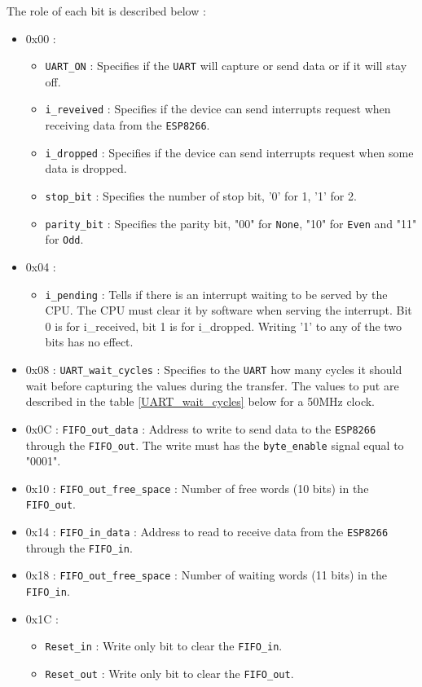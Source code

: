 \documentclass[11pt]{article}
\begin{document}
The role of each bit is described below :
\begin{itemize}
    \item 0x00 :
    \begin{itemize}
        \item \texttt{UART\_ON} : Specifies if the \texttt{UART} will capture or send data or if it will stay off.
        \item \texttt{i\_reveived} : Specifies if the device can send interrupts request when receiving data from the \texttt{ESP8266}.
        \item \texttt{i\_dropped} : Specifies if the device can send interrupts request when some data is dropped.
        \item \texttt{stop\_bit} : Specifies the number of stop bit, '0' for 1, '1' for 2.
        \item \texttt{parity\_bit} : Specifies the parity bit, "00" for \texttt{None}, "10" for \texttt{Even} and "11" for \texttt{Odd}.
    \end{itemize}
    \item 0x04 : 
    \begin{itemize}
        \item \texttt{i\_pending} : Tells if there is an interrupt waiting to be served by the CPU. The CPU must clear it by software when serving the interrupt. Bit 0 is for i\_received, bit 1 is for i\_dropped. Writing '1' to any of the two bits has no effect.
    \end{itemize}
    \item 0x08 : \texttt{UART\_wait\_cycles} : Specifies to the \texttt{UART} how many cycles it should wait before capturing the values during the transfer. The values to put are described in the table \ref{UART_wait_cycles} below for a 50MHz clock. 
    \item 0x0C : \texttt{FIFO\_out\_data} : Address to write to send data to the \texttt{ESP8266} through the \texttt{FIFO\_out}. The write must has the \texttt{byte\_enable} signal equal to "0001".
    \item 0x10 : \texttt{FIFO\_out\_free\_space} : Number of free words (10 bits) in the \texttt{FIFO\_out}. 
    \item 0x14 : \texttt{FIFO\_in\_data} : Address to read to receive data from the \texttt{ESP8266} through the \texttt{FIFO\_in}. 
    \item 0x18 : \texttt{FIFO\_out\_free\_space} : Number of waiting words (11 bits) in the \texttt{FIFO\_in}. 
    \item 0x1C :
    \begin{itemize}
        \item \texttt{Reset\_in} : Write only bit to clear the \texttt{FIFO\_in}.
        \item \texttt{Reset\_out} : Write only bit to clear the \texttt{FIFO\_out}.
    \end{itemize}
\end{itemize}
\end{document}
